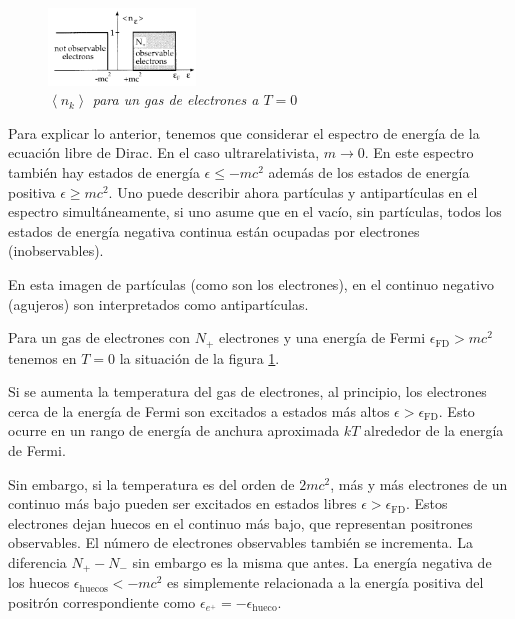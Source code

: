 \begin{figure}
\centering
\includegraphics[width=0.35\textwidth]{./Images/ParticleNumberGaswithTnull.png}
\caption[Número de partículas para un gas de electrones a $T=0$]{\emph{$\left\langle {n}_{k} \right\rangle$ para un gas de electrones a $T=0$}}
\label{fig: Gas de electrones}
\end{figure}

Para explicar lo anterior, tenemos que considerar el espectro de energía de la ecuación libre de Dirac. En el caso ultrarelativista, $m \rightarrow 0$. En este espectro también hay estados de energía $\epsilon \leq -m {c}^{2}$ además de los estados de energía positiva $\epsilon \geq m{c}^{2}$. Uno puede describir ahora partículas y antipartículas en el espectro simultáneamente, si uno asume que en el vacío, sin partículas, todos los estados de energía negativa continua están ocupadas por electrones (inobservables).

En esta imagen de partículas (como son los electrones), en el continuo negativo (agujeros) son interpretados como antipartículas.

Para un gas de electrones con ${N}_{+}$ electrones y una energía de Fermi ${\epsilon}_{\mathrm{FD}} > m{c}^{2}$ tenemos en $T=0$ la situación de la figura \ref{fig: Gas de electrones}.

Si se aumenta la temperatura del gas de electrones, al principio, los electrones cerca de la energía de Fermi son excitados a estados más altos ${\epsilon} > {\epsilon}_{\mathrm{FD}}$. Esto ocurre en un rango de energía de anchura aproximada $kT$ alrededor de la energía de Fermi.

Sin embargo, si la temperatura es del orden de $2m{c}^{2}$, más y más electrones de un continuo más bajo pueden ser excitados en estados libres $\epsilon > {\epsilon}_{\mathrm{FD}}$. Estos electrones dejan huecos en el continuo más bajo, que representan positrones observables. El número de electrones observables también se incrementa. La diferencia ${N}_{+} - {N}_{-}$ sin embargo es la misma que antes. La energía negativa de los huecos ${\epsilon}_{\mathrm{huecos}} < - m{c}^{2}$ es simplemente relacionada a la energía positiva del positrón correspondiente como ${\epsilon}_{{e}^{+}} = - {\epsilon}_{\mathrm{hueco}}$.

